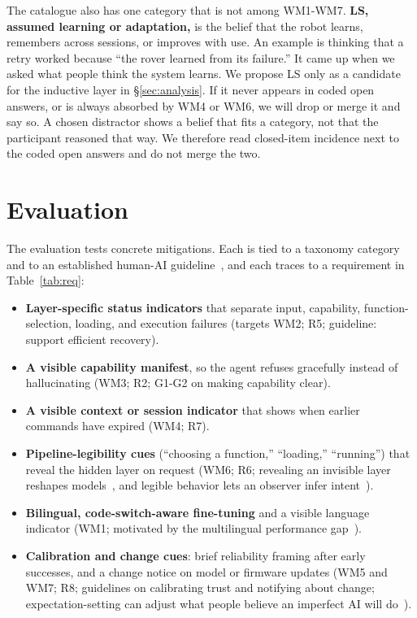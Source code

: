 \documentclass[sigconf]{acmart}
\begin{document}
The catalogue also has one category that is not among WM1-WM7. \textbf{LS, assumed learning or adaptation,} is the belief that the robot learns, remembers across sessions, or improves with use. An example is thinking that a retry worked because ``the rover learned from its failure.'' It came up when we asked what people think the system learns. We propose LS only as a candidate for the inductive layer in \S\ref{sec:analysis}. If it never appears in coded open answers, or is always absorbed by WM4 or WM6, we will drop or merge it and say so. A chosen distractor shows a belief that fits a category, not that the participant reasoned that way. We therefore read closed-item incidence next to the coded open answers and do not merge the two.



\section{Evaluation}\label{sec:eval}

The evaluation tests concrete mitigations. Each is tied to a taxonomy category and to an established human-AI guideline~\cite{amershi2019guidelines}, and each traces to a requirement in Table~\ref{tab:req}:
\begin{itemize}
  \item \textbf{Layer-specific status indicators} that separate input, capability, function-selection, loading, and execution failures (targets WM2; R5; guideline: support efficient recovery).
  \item \textbf{A visible capability manifest}, so the agent refuses gracefully instead of hallucinating (WM3; R2; G1-G2 on making capability clear).
  \item \textbf{A visible context or session indicator} that shows when earlier commands have expired (WM4; R7).
  \item \textbf{Pipeline-legibility cues} (``choosing a function,'' ``loading,'' ``running'') that reveal the hidden layer on request (WM6; R6; revealing an invisible layer reshapes models~\cite{eslami2015always}, and legible behavior lets an observer infer intent~\cite{dragan2013legibility}).
  \item \textbf{Bilingual, code-switch-aware fine-tuning} and a visible language indicator (WM1; motivated by the multilingual performance gap~\cite{joshi2020state}).
  \item \textbf{Calibration and change cues}: brief reliability framing after early successes, and a change notice on model or firmware updates (WM5 and WM7; R8; guidelines on calibrating trust and notifying about change; expectation-setting can adjust what people believe an imperfect AI will do~\cite{kocielnik2019accept}).
\end{itemize}
\end{document}
